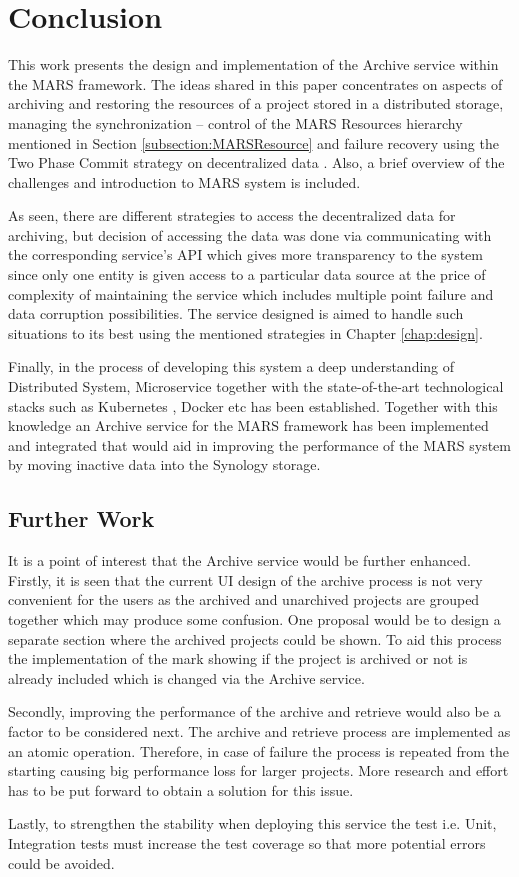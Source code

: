 \chapter{Conclusion}
This work presents the design and implementation of the Archive service within the MARS framework. The ideas shared
in this paper concentrates on aspects of archiving and restoring the resources of a project stored in a distributed storage, managing the synchronization
-- control of the MARS Resources hierarchy mentioned in Section \ref{subsection:MARSResource} and failure recovery using the Two Phase Commit strategy
on decentralized data \cite{atomic}.
Also, a brief overview of the challenges and introduction to MARS system is included.

As seen, there are different strategies to access the decentralized data for archiving, but decision of accessing the data was done via communicating
with the corresponding service's API which gives more transparency to the system since only one entity is given access to a particular data source at the price of 
complexity of maintaining the service which includes multiple point failure and data corruption possibilities. The service designed is aimed to handle such situations
to its best using the mentioned strategies in Chapter \ref{chap:design}.

Finally, in the process of developing this system a deep understanding of Distributed System, Microservice together with the state-of-the-art technological stacks
such as Kubernetes \cite{kubernetes}, Docker etc has been established. Together with this knowledge an Archive service for the MARS framework has been implemented and integrated 
that would aid in improving the performance of the MARS system by moving inactive data into the Synology storage.

\section{Further Work}
It is a point of interest that the Archive service would be further enhanced. Firstly, it is seen that the current UI design of the archive process is not very convenient
for the users as the archived and unarchived projects are grouped together which may produce some confusion. One proposal would be to design a separate section
where the archived projects could be shown. To aid this process the implementation of the mark showing if the project is archived or not is already included which is
changed via the Archive service. 

Secondly, improving the performance of the archive and retrieve would also be a factor to be considered next. The archive and retrieve process are implemented as
an atomic operation. Therefore, in case of failure the process is repeated from the starting causing big performance loss for larger projects. More research and effort
has to be put forward to obtain a solution for this issue. 

Lastly, to strengthen the stability when deploying this service the test i.e. Unit, Integration tests must increase the test coverage so that more potential
errors could be avoided. 


